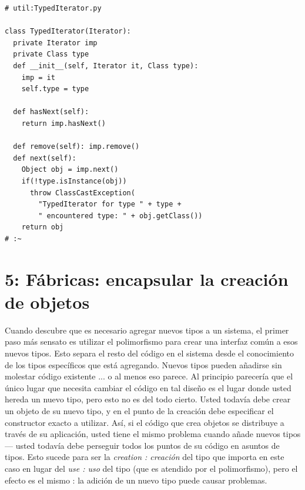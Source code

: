 \documentclass{article}
\begin{document}
\begin{lstlisting} 
# util:TypedIterator.py 

class TypedIterator(Iterator): 
  private Iterator imp 
  private Class type 
  def __init__(self, Iterator it, Class type): 
    imp = it 
    self.type = type 
    
  def hasNext(self):  
    return imp.hasNext()  
    
  def remove(self): imp.remove()  
  def next(self): 
    Object obj = imp.next() 
    if(!type.isInstance(obj)) 
      throw ClassCastException( 
        "TypedIterator for type " + type + 
        " encountered type: " + obj.getClass()) 
    return obj 
# :~ 
\end{lstlisting}

\section{\texorpdfstring{5: Fábricas: \newline  encapsular \newline la creación de objetos}{5: Fábricas: encapsular la creación de objetos}}


Cuando descubre que es necesario agregar nuevos tipos a un sistema, el primer paso más sensato es utilizar el polimorfismo para crear una interfaz común a esos nuevos tipos. Esto separa el resto del código en el sistema desde el conocimiento de los tipos específicos que está agregando. Nuevos tipos pueden añadirse sin molestar código existente ... o al menos eso parece. Al principio parecería que el único lugar que necesita cambiar el código en tal diseño es el lugar donde usted hereda un nuevo tipo, pero esto no es del todo cierto. Usted todavía debe crear un objeto de su nuevo tipo, y en el punto de la creación debe especificar el constructor exacto a utilizar. Así, si el código que crea objetos se distribuye a través de su aplicación, usted tiene el mismo problema cuando añade nuevos tipos — usted todavía debe perseguir todos los puntos de su código en asuntos de tipos. Esto sucede para ser la \textit{creation : creación} del tipo que importa en este caso en lugar del \textit{use : uso} del tipo (que es atendido por el polimorfismo), pero el efecto es el mismo : la adición de un nuevo tipo puede causar problemas. \newline
\end{document}
